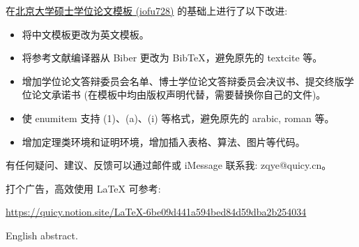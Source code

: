 \begin{cabstract}
    在\href{https://www.overleaf.com/latex/templates/2021-peking-university-master-thesis-template-iofu728-pkuthss/rwfvbkpzydpf}{北京大学硕士学位论文模板 (iofu728)} 的基础上进行了以下改进:
    \begin{itemize}
        \item 将中文模板更改为英文模板。
        \item 将参考文献编译器从 Biber 更改为 BibTeX，避免原先的 textcite 等。
        \item 增加学位论文答辩委员会名单、博士学位论文答辩委员会决议书、提交终版学位论文承诺书 (在模板中均由版权声明代替，需要替换你自己的文件)。
        \item 使 enumitem 支持 (1)、(a)、(i) 等格式，避免原先的 arabic, roman 等。
        \item 增加定理类环境和证明环境，增加插入表格、算法、图片等代码。
    \end{itemize}

    \bigskip

    有任何疑问、建议、反馈可以通过邮件或 iMessage 联系我: zqye@quicy.cn。
    
    \bigskip
    
    打个广告，高效使用 LaTeX 可参考:

    \url{https://quicy.notion.site/LaTeX-6be09d441a594bed84d59dba2b254034}


\end{cabstract}

\begin{eabstract}
English abstract.
\end{eabstract}